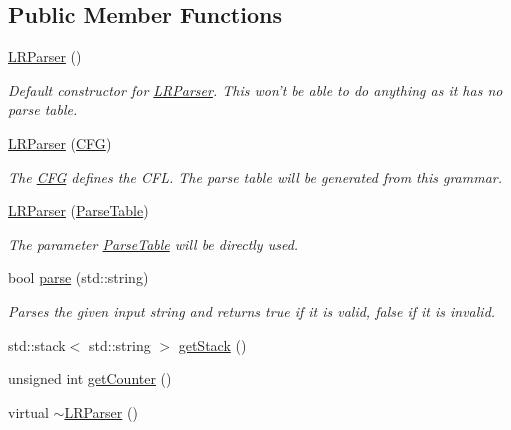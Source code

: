 \subsection*{Public Member Functions}
\begin{DoxyCompactItemize}
\item 
\hyperlink{classLRParser_adf2fe54095f02900d06389007a1e5f53}{L\-R\-Parser} ()
\begin{DoxyCompactList}\small\item\em Default constructor for \hyperlink{classLRParser}{L\-R\-Parser}. This won't be able to do anything as it has no parse table. \end{DoxyCompactList}\item 
\hyperlink{classLRParser_abee4e9919e49f66051167487fb467601}{L\-R\-Parser} (\hyperlink{classCFG}{C\-F\-G})
\begin{DoxyCompactList}\small\item\em The \hyperlink{classCFG}{C\-F\-G} defines the C\-F\-L. The parse table will be generated from this grammar. \end{DoxyCompactList}\item 
\hyperlink{classLRParser_a52727298bd32f6b4ac91d2e1351ffe49}{L\-R\-Parser} (\hyperlink{classParseTable}{Parse\-Table})
\begin{DoxyCompactList}\small\item\em The parameter \hyperlink{classParseTable}{Parse\-Table} will be directly used. \end{DoxyCompactList}\item 
bool \hyperlink{classLRParser_a0657ab1ec68beb8fce3756f7204079b4}{parse} (std\-::string)
\begin{DoxyCompactList}\small\item\em Parses the given input string and returns true if it is valid, false if it is invalid. \end{DoxyCompactList}\item 
std\-::stack$<$ std\-::string $>$ \hyperlink{classLRParser_ac832f117eb1ff5f21d9ed0a7426937a5}{get\-Stack} ()
\item 
unsigned int \hyperlink{classLRParser_a817415c2083c538a0380eace8ec4df5e}{get\-Counter} ()
\item 
virtual \hyperlink{classLRParser_a85b1487a331f1a617ee74965264fcf8f}{$\sim$\-L\-R\-Parser} ()
\end{DoxyCompactItemize}
